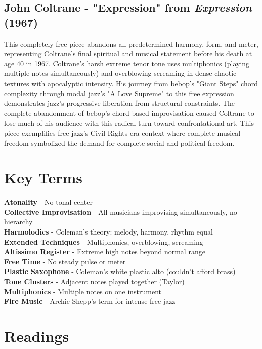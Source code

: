 \documentclass[11pt]{article}
\begin{document}
\subsection*{John Coltrane - "Expression" from \emph{Expression} (1967)}
This completely free piece abandons all predetermined harmony, form, and meter, representing Coltrane's final spiritual and musical statement before his death at age 40 in 1967. Coltrane's harsh extreme tenor tone uses multiphonics (playing multiple notes simultaneously) and overblowing screaming in dense chaotic textures with apocalyptic intensity. His journey from bebop's "Giant Steps" chord complexity through modal jazz's "A Love Supreme" to this free expression demonstrates jazz's progressive liberation from structural constraints. The complete abandonment of bebop's chord-based improvisation caused Coltrane to lose much of his audience with this radical turn toward confrontational art. This piece exemplifies free jazz's Civil Rights era context where complete musical freedom symbolized the demand for complete social and political freedom.

\section*{Key Terms}

\textbf{Atonality} - No tonal center \\
\textbf{Collective Improvisation} - All musicians improvising simultaneously, no hierarchy \\
\textbf{Harmolodics} - Coleman's theory: melody, harmony, rhythm equal \\
\textbf{Extended Techniques} - Multiphonics, overblowing, screaming \\
\textbf{Altissimo Register} - Extreme high notes beyond normal range \\
\textbf{Free Time} - No steady pulse or meter \\
\textbf{Plastic Saxophone} - Coleman's white plastic alto (couldn't afford brass) \\
\textbf{Tone Clusters} - Adjacent notes played together (Taylor) \\
\textbf{Multiphonics} - Multiple notes on one instrument \\
\textbf{Fire Music} - Archie Shepp's term for intense free jazz

\section*{Readings}
\end{document}
